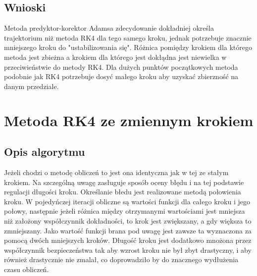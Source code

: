 \documentclass[a4paper, 11pt]{article}
\begin{document}
\subsection{Wnioski}
Metoda predyktor-korektor Adamsa zdecydowanie dokładniej określa trajektorium niż metoda RK4 dla tego samego kroku, jednak potrzebuje znacznie mniejszego kroku do "ustabilizowania się". Różnica pomiędzy krokiem dla którego metoda jest zbieżna a krokiem dla którego jest dokłądna jest niewielka w przeciwieństwie do metody RK4. Dla dużych punktów początkowych metoda podobnie jak RK4 potrzebuje dosyć małego kroku aby uzyskać zbierzność na danym przedziale. 

\section{Metoda RK4 ze zmiennym krokiem}
\subsection{Opis algorytmu}
Jeżeli chodzi o metodę obliczeń to jest ona identyczna jak w tej ze stałym krokiem. Na szczególną uwagę zasługuje sposób oceny błędu i na tej podstawie regulacji długości kroku. Określanie błedu jest realizowane metodą połowienia kroku. W pojedyńczej iteracji obliczne są wartości funkcji dla całego kroku i jego połowy, następnie jeżeli różnica między otrzymanymi wartościami jest mniejsza niż założony współczynnik dokładności, to krok jest zwiększany, a gdy większa to zmniejszany. Jako wartość funkcji brana pod uwagę jest zawsze ta wyznaczona za pomocą dwóch mniejszych kroków. Długość kroku jest dodatkowo mnożona przez współczynnik bezpieczeństwa tak aby wzrost kroku nie był zbyt drastyczny, i aby również drastycznie nie zmalał, co doprowadziło by do znacznego wydłużenia czasu obliczeń. 
\end{document}
